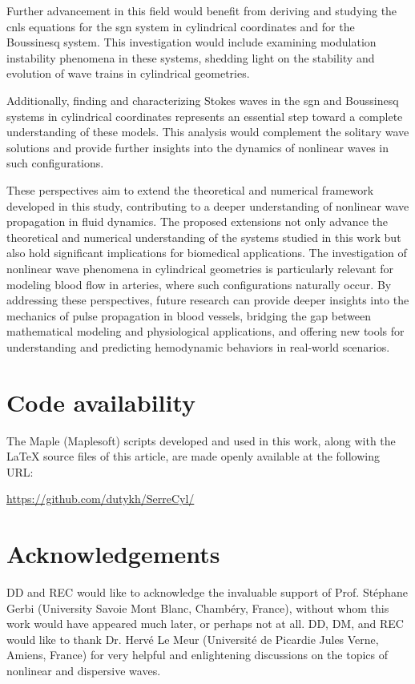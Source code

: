 \documentclass[alpha-refs, 12pt]{wiley-article}
\begin{document}
Further advancement in this field would benefit from deriving and studying the \acrfull{cnls} equations for the \acrshort{sgn} system in cylindrical coordinates and for the Boussinesq system. This investigation would include examining modulation instability phenomena in these systems, shedding light on the stability and evolution of wave trains in cylindrical geometries.

Additionally, finding and characterizing Stokes waves in the \acrshort{sgn} and Boussinesq systems in cylindrical coordinates represents an essential step toward a complete understanding of these models. This analysis would complement the solitary wave solutions and provide further insights into the dynamics of nonlinear waves in such configurations.

These perspectives aim to extend the theoretical and numerical framework developed in this study, contributing to a deeper understanding of nonlinear wave propagation in fluid dynamics. The proposed extensions not only advance the theoretical and numerical understanding of the systems studied in this work but also hold significant implications for biomedical applications. The investigation of nonlinear wave phenomena in cylindrical geometries is particularly relevant for modeling blood flow in arteries, where such configurations naturally occur. By addressing these perspectives, future research can provide deeper insights into the mechanics of pulse propagation in blood vessels, bridging the gap between mathematical modeling and physiological applications, and offering new tools for understanding and predicting hemodynamic behaviors in real-world scenarios.

\vspace*{1.5em}

\section*{Code availability}

The Maple (Maplesoft\texttrademark) scripts developed and used in this work, along with the LaTeX source files of this article, are made openly available at the following URL:

\url{https://github.com/dutykh/SerreCyl/}

\section*{Acknowledgements}

DD and REC would like to acknowledge the invaluable support of Prof. St\'ephane Gerbi (University Savoie Mont Blanc, Chamb\'ery, France), without whom this work would have appeared much later, or perhaps not at all. DD, DM, and REC would like to thank Dr. Herv\'e Le Meur (Universit\'e de Picardie Jules Verne, Amiens, France) for very helpful and enlightening discussions on the topics of nonlinear and dispersive waves.
\end{document}
